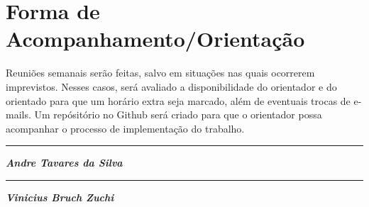 \documentclass[11pt]{article}
\begin{document}
\section{Forma de Acompanhamento/Orientação}

Reuniões semanais serão feitas, salvo em situações nas quais ocorrerem imprevistos.
Nesses casos, será avaliado a disponibilidade do orientador e do orientado para que um
horário extra seja marcado, além de eventuais trocas de e-mails. Um repósitório no Github
será criado para que o orientador possa acompanhar o processo de implementação do trabalho.




\vskip 2.5cm

\begin{minipage} {0.49\linewidth}
  \centering
  \rule{7.2cm}{0.1mm}

  \textbf{\textit{Andre Tavares da Silva}}
\end{minipage}
\begin{minipage} {0.49\linewidth}
  \centering
  \rule{7.2cm}{0.1mm}

  \textbf{\textit{Vinicius Bruch Zuchi}}
\end{minipage}
\end{document}
